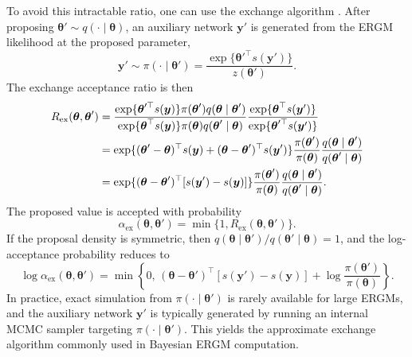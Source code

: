 \documentclass[preprint,12pt,authoryear]{elsarticle}
\def\bs{\boldsymbol}
\def\th{\boldsymbol{\theta}}
\begin{document}
To avoid this intractable ratio, one can use the exchange algorithm
\citep{moller2006efficient,murray2006mcmc}.
After proposing \(\th'\sim q(\cdot\mid \th)\), an auxiliary network
\(\bs y'\) is generated from the ERGM likelihood at the proposed parameter,
\[
\bs y' \sim \pi(\cdot\mid \th')
=
\frac{\exp\{\th'^\top s(\bs y')\}}{z(\th')}.
\]
The exchange acceptance ratio is then
\begin{align}
R_{\mathrm{ex}}(\th,\th')
&=
\frac{
\exp\{\th'^\top s(\bs y)\}\pi(\th')q(\th\mid \th')
}{
\exp\{\th^\top s(\bs y)\}\pi(\th)q(\th'\mid \th)
}
\frac{
\exp\{\th^\top s(\bs y')\}
}{
\exp\{\th'^\top s(\bs y')\}
} \notag \\
&=
\exp\{(\th'-\th)^\top s(\bs y)+(\th-\th')^\top s(\bs y')\}
\frac{\pi(\th')}{\pi(\th)}
\frac{q(\th\mid \th')}{q(\th'\mid \th)} \notag \\
&=
\exp\{(\th-\th')^\top [s(\bs y')-s(\bs y)]\}
\frac{\pi(\th')}{\pi(\th)}
\frac{q(\th\mid \th')}{q(\th'\mid \th)}.
\label{eq:exchange_ratio}
\end{align}
The proposed value is accepted with probability
\[
\alpha_{\mathrm{ex}}(\th,\th')=\min\{1,R_{\mathrm{ex}}(\th,\th')\}.
\]
If the proposal density is symmetric, then
\(q(\th\mid \th')/q(\th'\mid \th)=1\), and the log-acceptance probability reduces to
\[
\log \alpha_{\mathrm{ex}}(\th,\th')
=
\min\left\{
0,\,
(\th-\th')^\top [s(\bs y')-s(\bs y)]
+
\log \frac{\pi(\th')}{\pi(\th)}
\right\}.
\]
In practice, exact simulation from \(\pi(\cdot\mid \th')\) is rarely available for
large ERGMs, and the auxiliary network \(\bs y'\) is typically generated by running
an internal MCMC sampler targeting \(\pi(\cdot\mid \th')\). This yields the
approximate exchange algorithm commonly used in Bayesian ERGM computation.
\end{document}
